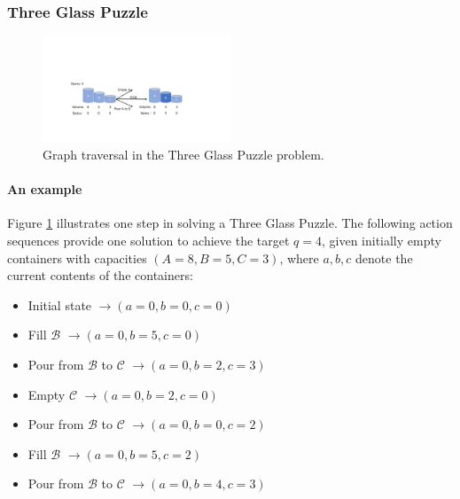 \subsubsection{Three Glass Puzzle}


	\begin{figure}[h!]
		\centering
		\includegraphics[width=0.5\textwidth]{figures/three_glasses_example_new}
		\caption{Graph traversal in the Three Glass Puzzle problem.}
		\label{fig:reorder_a}
	\end{figure}

\paragraph{An example} Figure \ref{fig:reorder_a} illustrates one step in solving a Three Glass Puzzle. 
	The following action sequences provide one solution to achieve the target $q=4$, given initially empty containers with capacities  $(A=8, B=5, C=3)$, where $a, b, c$ denote the current contents of the containers:
	\begin{itemize}
		\item  {Initial state} $\rightarrow (a=0, b=0, c=0)$  
		\item  {Fill $\mathcal{B}$} $\rightarrow (a=0, b=5, c=0)$ 
		\item  {Pour from $\mathcal{B}$ to $\mathcal{C}$} $\rightarrow (a=0, b=2, c=3)$ 
		\item  {Empty $\mathcal{C}$} $\rightarrow (a=0, b=2, c=0)$ 
    	\item  {Pour from $\mathcal{B}$ to $\mathcal{C}$} $\rightarrow (a=0, b=0, c=2)$ 
		\item  {Fill $\mathcal{B}$} $\rightarrow (a=0, b=5, c=2)$ 
		\item  {Pour from $\mathcal{B}$ to $\mathcal{C}$} $\rightarrow (a=0, b=4, c=3)$
	\end{itemize}

